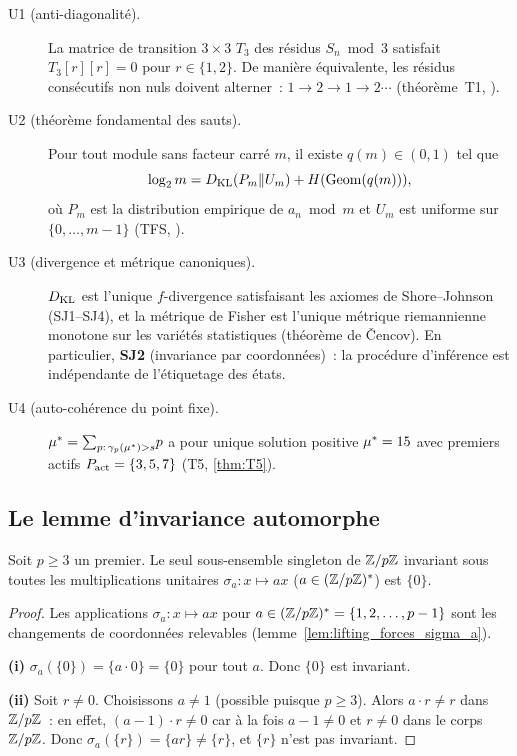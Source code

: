 \documentclass[12pt,a4paper]{article}
\begin{document}
\begin{description}
\item[U1 (anti-diagonalité).]
  La matrice de transition $3 \times 3$ $T_3$ des résidus
  $S_n \bmod 3$ satisfait $T_3[r][r] = 0$ pour $r \in \{1, 2\}$.
  De manière équivalente, les résidus consécutifs non nuls doivent
  alterner~: $1 \to 2 \to 1 \to 2 \cdots$
  (théorème~T1, \cite{companion_M1}).

\item[U2 (théorème fondamental des sauts).]
  Pour tout module sans facteur carré $m$, il existe
  $q(m) \in (0,1)$ tel que
  \begin{equation}
    \log_2 m = D_{\mathrm{KL}}(P_m \| U_m) + H(\mathrm{Geom}(q(m))),
    \label{eq:GFT_ch25}
  \end{equation}
  où $P_m$ est la distribution empirique de $a_n \bmod m$ et $U_m$
  est uniforme sur $\{0, \ldots, m-1\}$ (TFS, \cite{companion_M1}).

\item[U3 (divergence et métrique canoniques).]
  $D_{\mathrm{KL}}$ est l'unique $f$-divergence satisfaisant les axiomes de
  Shore--Johnson (SJ1--SJ4), et la métrique de Fisher est l'unique
  métrique riemannienne monotone sur les variétés statistiques
  (théorème de \v{C}encov). En particulier, \textbf{SJ2}
  (invariance par coordonnées)~: la procédure d'inférence est
  indépendante de l'étiquetage des états.

\item[U4 (auto-cohérence du point fixe).]
  ${\mu^{*}} = \sum_{p:\, \gamma_{p}({\mu^{*}}) > s}\! p$ a pour unique
  solution positive ${\mu^{*}} = 15$ avec premiers actifs
  $P_{\rm act} = \{3, 5, 7\}$ (T5, \cref{thm:T5}).
\end{description}

\subsection{Le lemme d'invariance automorphe}
\label{sec:ch25_aut_lemma}

\begin{lemme}
\label{lem:aut_invariance}
Soit $p \geq 3$ un premier. Le seul sous-ensemble singleton de
$\mathbb{Z}/p\mathbb{Z}$ invariant sous toutes les multiplications unitaires
$\sigma_a : x \mapsto ax$ ($a \in (\mathbb{Z}/p\mathbb{Z})^*$) est $\{0\}$.
\end{lemme}

\begin{proof}
Les applications $\sigma_a : x \mapsto ax$ pour
$a \in (\mathbb{Z}/p\mathbb{Z})^* = \{1, 2, \ldots, p-1\}$ sont les changements de
coordonnées relevables (lemme~\ref{lem:lifting_forces_sigma_a}).

\textbf{(i)} $\sigma_a(\{0\}) = \{a \cdot 0\} = \{0\}$ pour tout $a$.
Donc $\{0\}$ est invariant.

\textbf{(ii)} Soit $r \neq 0$. Choisissons $a \neq 1$ (possible
puisque $p \geq 3$). Alors $a \cdot r \neq r$ dans $\mathbb{Z}/p\mathbb{Z}$~:
en effet, $(a - 1) \cdot r \neq 0$ car à la fois $a - 1 \neq 0$ et
$r \neq 0$ dans le corps $\mathbb{Z}/p\mathbb{Z}$. Donc
$\sigma_a(\{r\}) = \{ar\} \neq \{r\}$, et $\{r\}$ n'est pas invariant.
\end{proof}
\end{document}
